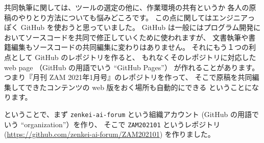\documentclass[dvipdfmx,autodetect-engine,10pt,b5paper,papersize,openany,dvipsnames]{jsbook}
\begin{document}
\begin{multicols}{2}
共同執筆に関しては、ツールの選定の他に、作業環境の共有というか
各人の原稿のやりとり方法についても悩みどころです。
この点に関してはエンジニアっぽく GitHub を使おうと思っていました。
GitHub は一般にはプログラム開発においてソースコードを共同で修正していくために使われますが、
文書執筆や書籍編集もソースコードの共同編集に変わりはありません。
それにもう１つの利点として GitHub のレポジトリを作ると、
もれなくそのレポジトリに対応した web page
（GitHub の用語でいう ``GitHub Pages''）
が作れることがあります。
つまり『月刊 ZAM 2021年1月号』のレポジトリを作って、
そこで原稿を共同編集してできたコンテンツの web 版をおく場所も自動的にできる
ということになります。


\vspace{5.0cm}

ということで、まず \texttt{zenkei-ai-forum} という組織アカウント
(GitHub の用語でいう ``organization''）を作り、
そこで \texttt{ZAM202101} というレポジトリ
(\url{https://github.com/zenkei-ai-forum/ZAM202101})
を作りました。


\vspace{3.5cm}


\end{multicols}
\end{document}
